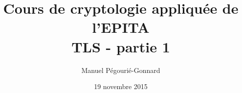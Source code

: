 \documentclass{mpg-ep-slides}
\author[MPG]{Manuel Pégourié-Gonnard}
\institute[ARM]{\normalsize ARM France - IoT - mbed TLS}
\title{Cours de cryptologie appliquée de l'EPITA \\ TLS - partie 1}
\date{19 novembre 2015}
\begin{document}
\maketitle

\toc
\end{document}
